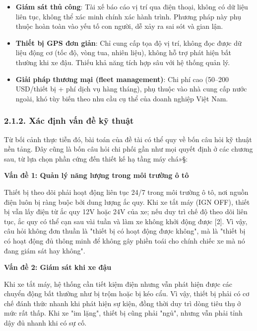 \documentclass[a4paper]{extarticle}
\providecommand{\tightlist}{%
  \setlength{\itemsep}{0pt}\setlength{\parskip}{0pt}}
\begin{document}
\begin{itemize}
\tightlist
\item
  \textbf{Giám sát thủ công}: Tài xế báo cáo vị trí qua điện thoại,
  không có dữ liệu liên tục, không thể xác minh chính xác hành trình.
  Phương pháp này phụ thuộc hoàn toàn vào yếu tố con người, dễ xảy ra
  sai sót và gian lận.
\item
  \textbf{Thiết bị GPS đơn giản}: Chỉ cung cấp tọa độ vị trí, không đọc
  được dữ liệu động cơ (tốc độ, vòng tua, nhiên liệu), không hỗ trợ phát
  hiện bất thường khi xe đậu. Thiếu khả năng tích hợp sâu với hệ thống
  quản lý.
\item
  \textbf{Giải pháp thương mại (fleet management)}: Chi phí cao (50--200
  USD/thiết bị + phí dịch vụ hàng tháng), phụ thuộc vào nhà cung cấp
  nước ngoài, khó tùy biến theo nhu cầu cụ thể của doanh nghiệp Việt
  Nam.
\end{itemize}

\subsubsection{2.1.2. Xác định vấn đề kỹ
thuật}\label{212-xuxe1c-ux111ux1ecbnh-vux1ea5n-ux111ux1ec1-kux1ef9-thuux1eadt}

Từ bối cảnh thực tiễn đó, bài toán của đề tài có thể quy về bốn câu hỏi
kỹ thuật nền tảng. Đây cũng là bốn câu hỏi chi phối gần như mọi quyết
định ở các chương sau, từ lựa chọn phần cứng đến thiết kế hạ tầng máy
chá»§:

\textbf{Vấn đề 1: Quản lý năng lượng trong môi trường ô tô}

Thiết bị theo dõi phải hoạt động liên tục 24/7 trong môi trường ô tô,
nơi nguồn điện luôn bị ràng buộc bởi dung lượng ắc quy. Khi xe tắt máy
(IGN OFF), thiết bị vẫn lấy điện từ ắc quy 12V hoặc 24V của xe; nếu duy
trì chế độ theo dõi liên tục, ắc quy có thể cạn sau vài tuần và làm xe
không khởi động được {[}2{]}. Vì vậy, câu hỏi không đơn thuần là "thiết
bị có hoạt động được không", mà là "thiết bị có hoạt động đủ thông minh
để không gây phiền toái cho chính chiếc xe mà nó đang giám sát hay
không".

\textbf{Vấn đề 2: Giám sát khi xe đậu}

Khi xe tắt máy, hệ thống cần tiết kiệm điện nhưng vẫn phát hiện được các
chuyển động bất thường như bị trộm hoặc bị kéo cẩu. Vì vậy, thiết bị
phải có cơ chế đánh thức nhanh khi phát hiện sự kiện, đồng thời duy trì
dòng tiêu thụ ở mức rất thấp. Khi xe "im lặng", thiết bị cũng phải
"ngủ", nhưng vẫn phải tỉnh dậy đủ nhanh khi có sự cố.
\end{document}

